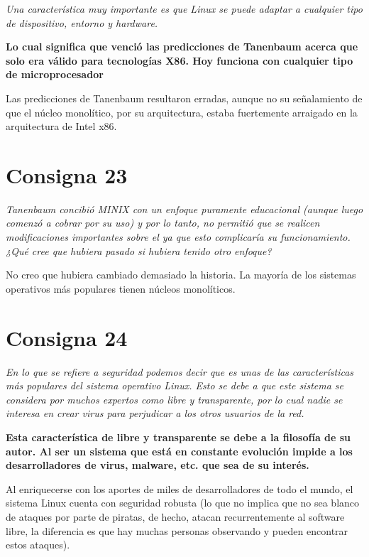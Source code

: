 \documentclass[11pt]{article}
\begin{document}
\emph{
     Una característica muy importante es que Linux se puede adaptar a cualquier
     tipo de dispositivo, entorno y hardware.
}

\textbf{
    Lo cual significa que venció las predicciones de Tanenbaum acerca que solo
    era válido para tecnologías X86. Hoy funciona con cualquier tipo de
    microprocesador
}

Las predicciones de Tanenbaum resultaron erradas, aunque no su señalamiento de 
que el núcleo monolítico, por su arquitectura, estaba fuertemente arraigado en 
la arquitectura de Intel x86.

\section*{Consigna 23}

\emph{
    Tanenbaum concibió MINIX con un enfoque puramente educacional (aunque luego
    comenzó a cobrar por su uso) y por lo tanto, no permitió que se realicen
    modificaciones importantes sobre el ya que esto complicaría su
    funcionamiento. ¿Qué cree que hubiera pasado si hubiera tenido otro enfoque?
}

No creo que hubiera cambiado demasiado la historia. La mayoría de los sistemas 
operativos más populares tienen núcleos monolíticos.

\section*{Consigna 24}

\emph{
    En lo que se refiere a seguridad podemos decir que es unas de las
    características más populares del sistema operativo Linux. Esto se debe a
    que este sistema se considera por muchos expertos como libre y transparente,
    por lo cual nadie se interesa en crear virus para perjudicar a los otros
    usuarios de la red.
}

\textbf{
    Esta característica de libre y transparente se debe a la filosofía de su
    autor. Al ser un sistema que está en constante evolución impide a los
    desarrolladores de virus, malware, etc. que sea de su interés.
}

Al enriquecerse con los aportes de miles de desarrolladores de todo el mundo, el 
sistema Linux cuenta con seguridad robusta (lo que no implica que no sea blanco
de ataques por parte de piratas, de hecho, atacan recurrentemente al software 
libre, la diferencia es que hay muchas personas observando y pueden encontrar 
estos ataques).
\end{document}
